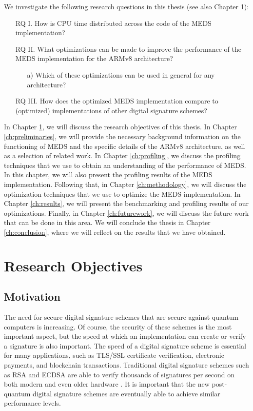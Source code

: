 \documentclass[11pt,a4paper]{report}
\theoremstyle{definition}
\begin{document}
We investigate the following research questions in this thesis (see also Chapter \ref{ch:researchobjectives}):
\begin{itemize}[left=35pt,labelsep=15pt]
  \item[RQ I.] How is CPU time distributed across the code of the MEDS implementation?
  \item[RQ II.] What optimizations can be made to improve the performance of the MEDS implementation for the ARMv8 architecture?
  \begin{itemize}
    \item[a)] Which of these optimizations can be used in general for any 
    architecture?
  \end{itemize}
  \item[RQ III.] How does the optimized MEDS implementation compare to (optimized) implementations of other digital signature schemes?
\end{itemize}

In Chapter \ref{ch:researchobjectives}, we will discuss the research objectives of this thesis. In Chapter \ref{ch:preliminaries}, we will provide the necessary background information on the functioning of MEDS and the specific details of the ARMv8 architecture, as well as a selection of related work. In Chapter \ref{ch:profiling}, we discuss the profiling techniques that we use to obtain an understanding of the performance of MEDS. In this chapter, we will also present the profiling results of the MEDS implementation. Following that, in Chapter \ref{ch:methodology}, we will discuss the optimization techniques that we use to optimize the MEDS implementation. In Chapter \ref{ch:results}, we will present the benchmarking and profiling results of our optimizations. Finally, in Chapter \ref{ch:futurework}, we will discuss the future work that can be done in this area. We will conclude the thesis in Chapter \ref{ch:conclusion}, where we will reflect on the results that we have obtained.

\chapter{Research Objectives}
\label{ch:researchobjectives}

\section{Motivation}
The need for secure digital signature schemes that are secure against quantum computers is increasing. Of course, the security of these schemes is the most important aspect, but the speed at which an implementation can create or verify a signature is also important. The speed of a digital signature scheme is essential for many applications, such as TLS/SSL certificate verification, electronic payments, and blockchain transactions. Traditional digital signature schemes such as RSA \cite{rivest1978method} and ECDSA \cite{johnson2001elliptic} are able to verify thousands of signatures per second on both modern and even older hardware \cite{koppl2021performance,de1998performance}. It is important that the new post-quantum digital signature schemes are eventually able to achieve similar performance levels.
\end{document}
